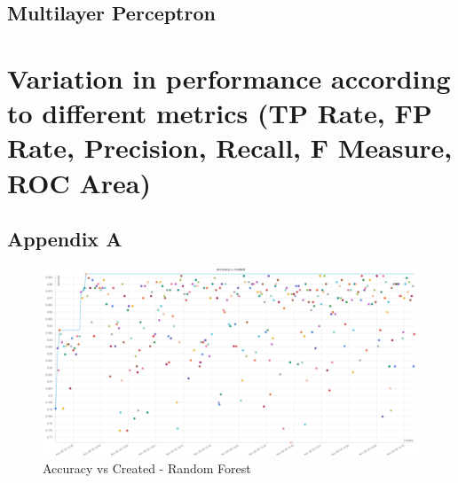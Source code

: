 \documentclass[11pt]{article}
\begin{document}
\newpage
\subsection{Multilayer Perceptron}



\newpage
\section{Variation in performance according to different metrics (TP Rate, FP Rate, Precision,
Recall, F Measure, ROC Area)}

\pagebreak
\appendix
\appendixpage
\addappheadtotoc
\begin{appendices}

\section{Appendix A}





\newpage
\begin{figure}
    \caption {Accuracy vs Created - Random Forest} \label{AccVCreatedRF}
    \centering
    \includegraphics[width = \textwidth, height = \textwidth, keepaspectratio]{Images/RF Accur vs Created.png}
\end{figure}


\end{appendices}
\end{document}

